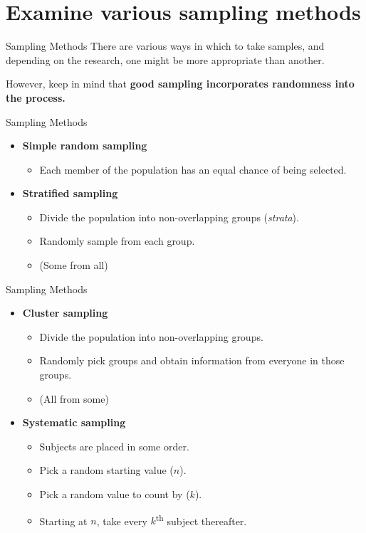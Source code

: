 \documentclass[t]{beamer}
\begin{document}
\section{Examine various sampling methods}

\begin{frame}{Sampling Methods}
There are various ways in which to take samples, and depending on the research, one might be more appropriate than another.	\newline\\	\pause

However, keep in mind that {\color{blue}\textbf{good sampling incorporates randomness into the process.}}
\end{frame}

\begin{frame}{Sampling Methods}
\begin{itemize}
	\item<+-> \textbf{Simple random sampling}
	\begin{itemize}
		\item<+-> Each member of the population has an equal chance of being selected.
	\end{itemize}	\vspace{10pt}
	\item<+-> \textbf{Stratified sampling}
	\begin{itemize}
		\item<+-> Divide the population into non-overlapping groups (\textit{strata}).
		\item<+-> Randomly sample from each group.
		\item<+-> (Some from all)
	\end{itemize}
\end{itemize}
\end{frame}

\begin{frame}{Sampling Methods}
\begin{itemize}
	\item<+-> \textbf{Cluster sampling}
	\begin{itemize}
		\item<+-> Divide the population into non-overlapping groups.
		\item<+-> Randomly pick groups and obtain information from everyone in those groups.
		\item<+-> (All from some)
	\end{itemize}	\vspace{10pt}
	\item<+-> \textbf{Systematic sampling}
	\begin{itemize}
		\item<+-> Subjects are placed in some order.
		\item<+-> Pick a random starting value ($n$).
		\item<+-> Pick a random value to count by ($k$).
		\item<+-> Starting at $n$, take every $k$\textsuperscript{th} subject thereafter.
	\end{itemize}
\end{itemize}
\end{frame}
\end{document}
